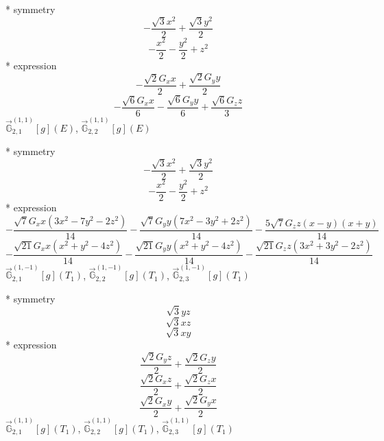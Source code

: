 \documentclass[fleqn,8pt]{jsarticle}
\begin{document}
\noindent\quad ** symmetry
\begin{dmath*}
- \frac{\sqrt{3} x^{2}}{2} + \frac{\sqrt{3} y^{2}}{2}
\end{dmath*}
\begin{dmath*}
- \frac{x^{2}}{2} - \frac{y^{2}}{2} + z^{2}
\end{dmath*}
\noindent\quad ** expression
\begin{dmath*}
- \frac{\sqrt{2} G_{x} x}{2} + \frac{\sqrt{2} G_{y} y}{2}
\end{dmath*}
\begin{dmath*}
- \frac{\sqrt{6} G_{x} x}{6} - \frac{\sqrt{6} G_{y} y}{6} + \frac{\sqrt{6} G_{z} z}{3}
\end{dmath*}
\noindent\quad $\vec{\mathbb{G}}_{2,1}^{(1,1)}[g](E)$, $\vec{\mathbb{G}}_{2,2}^{(1,1)}[g](E)$

\noindent\quad ** symmetry
\begin{dmath*}
- \frac{\sqrt{3} x^{2}}{2} + \frac{\sqrt{3} y^{2}}{2}
\end{dmath*}
\begin{dmath*}
- \frac{x^{2}}{2} - \frac{y^{2}}{2} + z^{2}
\end{dmath*}
\noindent\quad ** expression
\begin{dmath*}
- \frac{\sqrt{7} G_{x} x \left(3 x^{2} - 7 y^{2} - 2 z^{2}\right)}{14} - \frac{\sqrt{7} G_{y} y \left(7 x^{2} - 3 y^{2} + 2 z^{2}\right)}{14} - \frac{5 \sqrt{7} G_{z} z \left(x - y\right) \left(x + y\right)}{14}
\end{dmath*}
\begin{dmath*}
- \frac{\sqrt{21} G_{x} x \left(x^{2} + y^{2} - 4 z^{2}\right)}{14} - \frac{\sqrt{21} G_{y} y \left(x^{2} + y^{2} - 4 z^{2}\right)}{14} - \frac{\sqrt{21} G_{z} z \left(3 x^{2} + 3 y^{2} - 2 z^{2}\right)}{14}
\end{dmath*}
\noindent\quad $\vec{\mathbb{G}}_{2,1}^{(1,-1)}[g](T_{1})$, $\vec{\mathbb{G}}_{2,2}^{(1,-1)}[g](T_{1})$, $\vec{\mathbb{G}}_{2,3}^{(1,-1)}[g](T_{1})$

\noindent\quad ** symmetry
\begin{dmath*}
\sqrt{3} y z
\end{dmath*}
\begin{dmath*}
\sqrt{3} x z
\end{dmath*}
\begin{dmath*}
\sqrt{3} x y
\end{dmath*}
\noindent\quad ** expression
\begin{dmath*}
\frac{\sqrt{2} G_{y} z}{2} + \frac{\sqrt{2} G_{z} y}{2}
\end{dmath*}
\begin{dmath*}
\frac{\sqrt{2} G_{x} z}{2} + \frac{\sqrt{2} G_{z} x}{2}
\end{dmath*}
\begin{dmath*}
\frac{\sqrt{2} G_{x} y}{2} + \frac{\sqrt{2} G_{y} x}{2}
\end{dmath*}
\noindent\quad $\vec{\mathbb{G}}_{2,1}^{(1,1)}[g](T_{1})$, $\vec{\mathbb{G}}_{2,2}^{(1,1)}[g](T_{1})$, $\vec{\mathbb{G}}_{2,3}^{(1,1)}[g](T_{1})$
\end{document}
